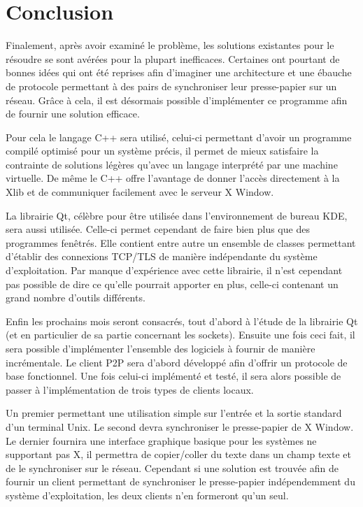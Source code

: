 \chapter*{Conclusion}
\renewcommand{\leftmark}{CONCLUSION}
Finalement, après avoir examiné le problème, les solutions existantes
pour le résoudre se sont avérées pour la plupart inefficaces. Certaines
ont pourtant de bonnes idées qui ont été reprises afin d'imaginer une
architecture et une ébauche de protocole permettant à des pairs de synchroniser
leur presse-papier sur un réseau. Grâce à cela, il est désormais possible
d'implémenter ce programme afin de fournir une solution efficace.

Pour cela le langage C++ sera utilisé, celui-ci permettant d'avoir un programme
compilé optimisé pour un système précis, il permet de mieux satisfaire
la contrainte de solutions légères qu'avec un langage interprété par une
machine virtuelle. De même le C++ offre l'avantage de donner l'accès
directement à la Xlib et de communiquer facilement avec le serveur
X Window.

La librairie Qt, célèbre pour être utilisée dans l'environnement de bureau
KDE, sera aussi utilisée. Celle-ci permet cependant de faire bien plus que des
programmes fenêtrés. Elle contient entre autre un ensemble de classes
permettant d'établir des connexions TCP/TLS de manière indépendante du
système d'exploitation. Par manque d'expérience avec cette librairie,
il n'est cependant pas possible de dire ce qu'elle pourrait apporter en plus,
celle-ci contenant un grand nombre d'outils différents.

Enfin les prochains mois seront consacrés, tout d'abord à l'étude de
la librairie Qt (et en particulier de sa partie concernant les sockets).
Ensuite une fois ceci fait, il sera possible d'implémenter l'ensemble
des logiciels à fournir de manière incrémentale. Le client P2P sera
d'abord développé afin d'offrir un protocole de base fonctionnel.
Une fois celui-ci implémenté et testé, il sera alors possible
de passer à l'implémentation de trois types de clients locaux.

Un premier permettant une utilisation simple sur l'entrée
et la sortie standard d'un terminal Unix. Le second devra synchroniser le
presse-papier de X Window. Le dernier fournira une interface graphique
basique pour les systèmes ne supportant pas X, il permettra de copier/coller
du texte dans un champ texte et de le synchroniser sur le réseau.
Cependant si une solution est trouvée afin de fournir un client
permettant de synchroniser le presse-papier indépendemment du système
d'exploitation, les deux clients n'en formeront qu'un seul.